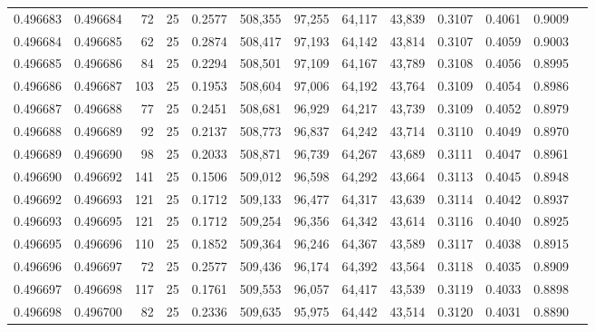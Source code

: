 \begin{tabular}{rrrrrrrrrrrrr}
0.496683 & 0.496684 &    72 &  25 &                                     0.2577 & 508,355 &  97,255 &  64,117 &  43,839 & 0.3107 & 0.4061 & 0.9009 \\
0.496684 & 0.496685 &    62 &  25 &                                     0.2874 & 508,417 &  97,193 &  64,142 &  43,814 & 0.3107 & 0.4059 & 0.9003 \\
0.496685 & 0.496686 &    84 &  25 &                                     0.2294 & 508,501 &  97,109 &  64,167 &  43,789 & 0.3108 & 0.4056 & 0.8995 \\
0.496686 & 0.496687 &   103 &  25 &                                     0.1953 & 508,604 &  97,006 &  64,192 &  43,764 & 0.3109 & 0.4054 & 0.8986 \\
0.496687 & 0.496688 &    77 &  25 &                                     0.2451 & 508,681 &  96,929 &  64,217 &  43,739 & 0.3109 & 0.4052 & 0.8979 \\
0.496688 & 0.496689 &    92 &  25 &                                     0.2137 & 508,773 &  96,837 &  64,242 &  43,714 & 0.3110 & 0.4049 & 0.8970 \\
0.496689 & 0.496690 &    98 &  25 &                                     0.2033 & 508,871 &  96,739 &  64,267 &  43,689 & 0.3111 & 0.4047 & 0.8961 \\
0.496690 & 0.496692 &   141 &  25 &                                     0.1506 & 509,012 &  96,598 &  64,292 &  43,664 & 0.3113 & 0.4045 & 0.8948 \\
0.496692 & 0.496693 &   121 &  25 &                                     0.1712 & 509,133 &  96,477 &  64,317 &  43,639 & 0.3114 & 0.4042 & 0.8937 \\
0.496693 & 0.496695 &   121 &  25 &                                     0.1712 & 509,254 &  96,356 &  64,342 &  43,614 & 0.3116 & 0.4040 & 0.8925 \\
0.496695 & 0.496696 &   110 &  25 &                                     0.1852 & 509,364 &  96,246 &  64,367 &  43,589 & 0.3117 & 0.4038 & 0.8915 \\
0.496696 & 0.496697 &    72 &  25 &                                     0.2577 & 509,436 &  96,174 &  64,392 &  43,564 & 0.3118 & 0.4035 & 0.8909 \\
0.496697 & 0.496698 &   117 &  25 &                                     0.1761 & 509,553 &  96,057 &  64,417 &  43,539 & 0.3119 & 0.4033 & 0.8898 \\
0.496698 & 0.496700 &    82 &  25 &                                     0.2336 & 509,635 &  95,975 &  64,442 &  43,514 & 0.3120 & 0.4031 & 0.8890 \\

\end{tabular}
